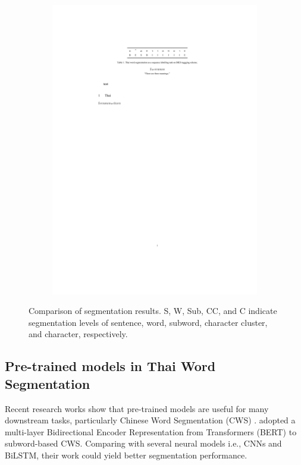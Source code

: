 \begin{figure}
\begin{subfigure}{0.24\textwidth}
        \includegraphics[width=\textwidth]{figures/fig-thbies-tran.pdf}
    \end{subfigure}
    \caption{Comparison of segmentation results. S, W, Sub, CC, and C indicate segmentation levels of sentence, word, subword, character cluster, and character, respectively.}
    \label{fig:tccsub}
\end{figure}

\subsection{Pre-trained models in Thai Word Segmentation}
Recent research works show that pre-trained models are useful for many downstream tasks, particularly Chinese Word Segmentation (CWS) \cite{yang-etal-2019-bert,qiu-etal-2020-concise,ke-etal-2020-unified,huang-etal-2020-towards,ke-etal-2021-pre}.
%
 adopted a multi-layer Bidirectional Encoder Representation from Transformers (BERT) to subword-based CWS.
%
Comparing with several neural models i.e., CNNs and BiLSTM, their work could yield better segmentation performance.
%

